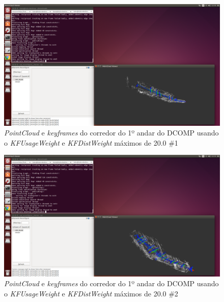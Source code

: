 \begin{figure}[H]
	\centering
		\includegraphics[width= \textwidth]{Imagens/figura3-40.png}
	\caption{\textit{PointCloud} e \textit{keyframes} do corredor do 1º andar do DCOMP usando o \textit{KFUsageWeight} e \textit{KFDistWeight} máximos de 20.0 \#1}
	\label{fig3:38}
\end{figure}

\begin{figure}[H]
	\centering
		\includegraphics[width= \textwidth]{Imagens/figura3-41.png}
	\caption{\textit{PointCloud} e \textit{keyframes} do corredor do 1º andar do DCOMP usando o \textit{KFUsageWeight} e \textit{KFDistWeight} máximos de 20.0 \#2}
	\label{fig3:39}
\end{figure}